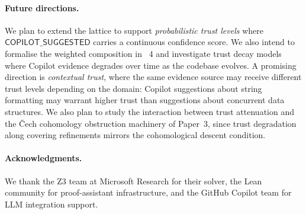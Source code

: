 \documentclass[11pt]{article}
\newcommand{\CopSugg}{\mathsf{COPILOT\_SUGGESTED}}
\begin{document}
\paragraph{Future directions.}
We plan to extend the lattice to support \emph{probabilistic trust levels}
where $\CopSugg$ carries a continuous confidence score.  We also intend to
formalise the weighted composition in \LEAN~4 and investigate trust decay
models where Copilot evidence degrades over time as the codebase evolves.
A promising direction is \emph{contextual trust}, where the same evidence
source may receive different trust levels depending on the domain: Copilot
suggestions about string formatting may warrant higher trust than suggestions
about concurrent data structures.  We also plan to study the interaction
between trust attenuation and the Čech cohomology obstruction machinery
of Paper~3, since trust degradation along covering refinements mirrors
the cohomological descent condition.

\paragraph{Acknowledgments.}
We thank the Z3 team at Microsoft Research for their solver, the Lean
community for proof-assistant infrastructure, and the GitHub Copilot team
for LLM integration support.
\end{document}
